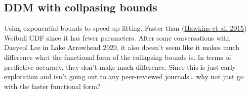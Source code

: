 \documentclass[
]{book}
\begin{document}
\hypertarget{ddm-with-collpasing-bounds}{%
\subsection{DDM with collpasing bounds}\label{ddm-with-collpasing-bounds}}

Using exponential bounds to speed up fitting. Faster than (\protect\hyperlink{ref-hawkins2015}{Hawkins et al. 2015}) Weibull CDF since it has fewer parameters. After some conversations with Daeyeol Lee in Lake Arrowhead 2020, it also doesn't seem like it makes much difference what the functional form of the collapsing bounds is. In terms of predictive accuracy, they don't make much difference. Since this is just early exploration and isn't going out to any peer-reviewed journals\ldots{} why not just go with the faster functional form?
\end{document}
